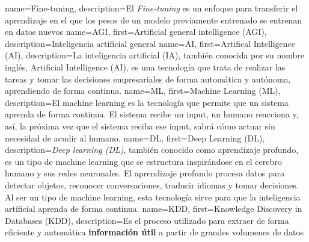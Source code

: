       {name={Fine-tuning},    description={El \textit{Fine-tuning} es un enfoque para transferir el aprendizaje en el que los pesos de un modelo previamente entrenado se entrenan en datos nuevos}}
      {name={AGI},        first={Artificial general intelligence (AGI)},          description={Inteligencia artificial general}}
       {name={AI},         first={Artifical Intelligence (AI)},                    description={La inteligencia artificial (IA), también conocida por su nombre inglés, Artificial Intelligence (AI), es una tecnología que trata de realizar las tareas y tomar las decisiones empresariales de forma automática y autónoma, aprendiendo de forma continua. \cite{glosario-tic-artificial-intelligence}}}
       {name={ML},         first={Machine Learning (ML)},                          description={El machine learning es la tecnología que permite que un sistema aprenda de forma continua. El sistema recibe un input, un humano reacciona y, así, la próxima vez que el sistema reciba ese input, sabrá cómo actuar sin necesidad de acudir al humano. \cite{glosario-tic-machine-learning}}}
       {name={DL},         first={Deep Learning (DL)},                             description={\textit{Deep learning (DL)}, también conocido como aprendizaje profundo, es un tipo de machine learning que se estructura inspirándose en el cerebro humano y sus redes neuronales. El aprendizaje profundo procesa datos para detectar objetos, reconocer conversaciones, traducir idiomas y tomar decisiones. Al ser un tipo de machine learning, esta tecnología sirve para que la inteligencia artificial aprenda de forma continua. \cite{glosario-tic-deep-learning}}}
      {name={KDD},        first={Knowledge Discovery in Databases (KDD)},         description={Es el proceso utilizado para extraer de forma eficiente y automática \textbf{información útil} a partir de grandes volumenes de datos}}

